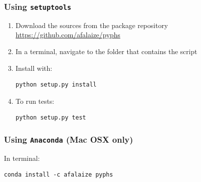 \documentclass[10pt,a4paper]{article}
\begin{document}
\subsubsection{{Using \texttt{setuptools}}}
%
\begin{enumerate}
\item Download the sources from the package repository\\ \url{https://github.com/afalaize/pyphs}
\item In a terminal, navigate to the folder that contains the  script
\item Install with: 
\begin{verbatim}
python setup.py install
\end{verbatim}
\item To run tests:
\begin{verbatim}
python setup.py test
\end{verbatim}
\end{enumerate}
%
%
\subsubsection{{Using \texttt{Anaconda} (Mac OSX only)}}
%
In terminal:
%
\begin{verbatim}
conda install -c afalaize pyphs
\end{verbatim}
%
\end{document}
